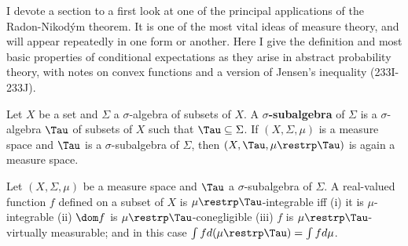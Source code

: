 
\def\chaptername{The Radon-Nikod\'ym theorem}
\def\sectionname{Conditional expectations}


I devote a section to a first look at one of the principal applications
of the Radon-Nikod\'ym theorem.   It is one of the most
vital ideas of measure theory, and will appear repeatedly in one form or
another.   Here I give the definition and most basic properties of
conditional expectations as they arise in abstract probability theory,
with notes on convex functions and a version of Jensen's inequality
(233I-233J).

 Let $X$ be a set and $\Sigma$ a
$\sigma$-algebra of subsets of $X$.   A {\bf $\sigma$-subalgebra} of
$\Sigma$ is a $\sigma$-algebra $\Tau$ of subsets of $X$ such that
$\Tau\subseteq\Sigma$.   If $(X,\Sigma,\mu)$ is a measure space and
$\Tau$ is a $\sigma$-subalgebra of $\Sigma$, then
$(X,\Tau,\mu\restrp\Tau)$ is again a measure space.

 Let $(X,\Sigma,\mu)$ be a measure space and $\Tau$
a $\sigma$-subalgebra of $\Sigma$.   A real-valued function $f$ defined
on a subset of $X$
is $\mu\restrp\Tau$-integrable iff (i) it is $\mu$-integrable (ii)
$\dom f$ is $\mu\restrp\Tau$-conegligible (iii) $f$ is
$\mu\restrp\Tau$-virtually measurable;  and in this case
$\int fd(\mu\restrp\Tau)=\int fd\mu$.

